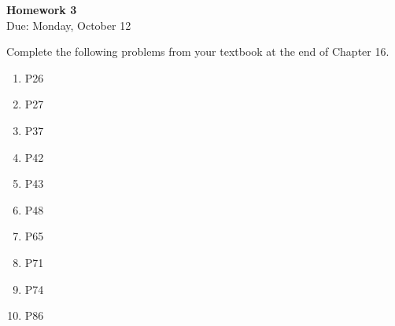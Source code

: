 \documentclass{article}
\begin{document}
\fancyfoot[C]{\thepage}
\vspace*{0cm}
\begin{center}
	{\LARGE \textbf{Homework 3}}\\
	\vspace{0.25cm}
	{\Large Due: Monday, October 12}
\end{center}

Complete the following problems from your textbook at the end of Chapter 16.
\begin{enumerate}
\item P26
\item P27
\item P37
\item P42
\item P43
\item P48
\item P65
\item P71
\item P74
\item P86
\end{enumerate}
\end{document}
